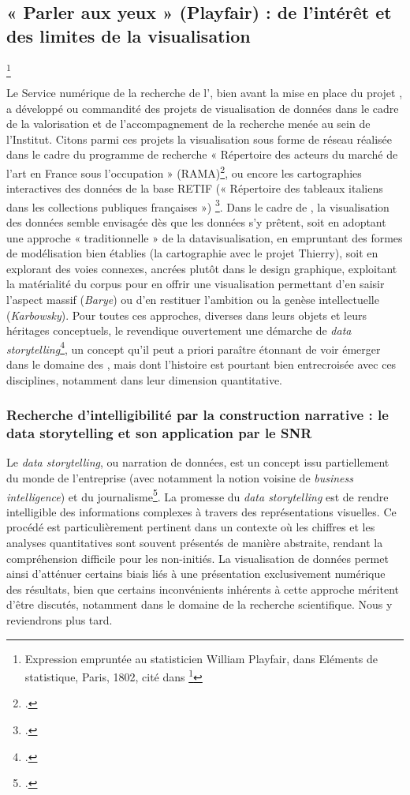 \subsection{« Parler aux yeux » (Playfair) : de l’intérêt et des limites de la visualisation}\footnote{Expression empruntée au statisticien William Playfair, dans Eléments de statistique, Paris, 1802, cité dans \footcite{courtin_rapport_2019}}

Le Service numérique de la recherche de l’\inha, bien avant la mise en place du projet \pense, a développé ou commandité des projets de visualisation de données dans le cadre de la valorisation et de l’accompagnement de la recherche menée au sein de l’Institut. Citons parmi ces projets la visualisation sous forme de réseau réalisée dans le cadre du programme de recherche « Répertoire des acteurs du marché de l’art en France sous l’occupation » (RAMA)\footcite{inha_repertoire_nodate}, ou encore les cartographies interactives des données de la base RETIF (« Répertoire des tableaux italiens dans les collections publiques françaises ») \footcite{inha_repertoire_nodate-1}. 
Dans le cadre de \pense, la visualisation des données semble envisagée dès que les données s’y prêtent, soit en adoptant une approche « traditionnelle » de la datavisualisation, en empruntant des formes de modélisation bien établies (la cartographie avec le projet Thierry), soit en explorant des voies connexes, ancrées plutôt dans le design graphique, exploitant la matérialité du corpus pour en offrir une visualisation permettant d’en saisir l’aspect massif (\textit{Barye}) ou d’en restituer l’ambition ou la genèse intellectuelle (\textit{Karbowsky}). Pour toutes ces approches, diverses dans leurs objets et leurs héritages conceptuels, le \snr revendique ouvertement une démarche de  \textit{data storytelling}\footcite{inha_visualisation_nodate}, un concept qu’il peut a priori paraître étonnant de voir émerger dans le domaine des \shs, mais dont l’histoire est pourtant bien entrecroisée avec ces disciplines, notamment dans leur dimension quantitative.

\subsubsection{Recherche d’intelligibilité par la construction narrative : le data storytelling et son application par le SNR}

Le \textit{data storytelling}, ou narration de données, est un concept issu partiellement du monde de l’entreprise (avec notamment la notion voisine de \textit{business intelligence}) et du journalisme\footcite{sanders_developing_nodate}. La promesse du \textit{data storytelling} est de rendre intelligible des informations complexes à travers des représentations visuelles. Ce procédé est particulièrement pertinent dans un contexte où les chiffres et les analyses quantitatives sont souvent présentés de manière abstraite, rendant la compréhension difficile pour les non-initiés. La visualisation de données permet ainsi d’atténuer certains biais liés à une présentation exclusivement numérique des résultats, bien que certains inconvénients inhérents à cette approche méritent d’être discutés, notamment dans le domaine de la recherche scientifique. Nous y reviendrons plus tard.

